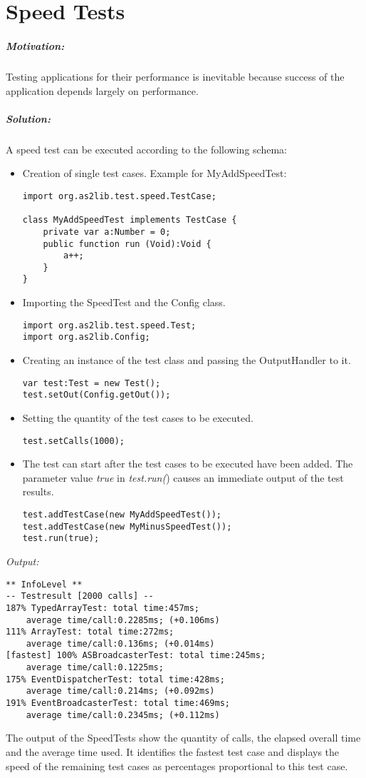 \chapter{Speed Tests}
\label{sec:SpeedTests}

\paragraph{Motivation:}
Testing applications for their performance is inevitable because success of the application depends largely on performance.

\paragraph{Solution:}
A speed test can be executed according to the following schema:
\begin{itemize}
	\item Creation of single test cases.
	Example for MyAddSpeedTest:
\begin{lstlisting}[frame=single]
import org.as2lib.test.speed.TestCase;

class MyAddSpeedTest implements TestCase {
	private var a:Number = 0;
	public function run (Void):Void {
		a++;
	}
}
\end{lstlisting}
	\item Importing the SpeedTest and the Config class.
\begin{lstlisting}[frame=single]
import org.as2lib.test.speed.Test;
import org.as2lib.Config;
\end{lstlisting}
	\item Creating an instance of the test class and passing the OutputHandler to it.
\begin{lstlisting}[frame=single]
var test:Test = new Test();
test.setOut(Config.getOut());
\end{lstlisting}
	\item Setting the quantity of the test cases to be executed.
\begin{lstlisting}[frame=single]
test.setCalls(1000);
\end{lstlisting}
	\item The test can start after the test cases to be executed have been added. The parameter value \emph{true} in \emph{test.run(}) causes an immediate output of the test results.
\begin{lstlisting}[frame=single]
test.addTestCase(new MyAddSpeedTest());
test.addTestCase(new MyMinusSpeedTest());
test.run(true);
\end{lstlisting}
\end{itemize}
\clearpage
\emph{Output:}
\begin{lstlisting}[frame=single]
** InfoLevel **
-- Testresult [2000 calls] --
187% TypedArrayTest: total time:457ms; 
	average time/call:0.2285ms; (+0.106ms)
111% ArrayTest: total time:272ms; 
	average time/call:0.136ms; (+0.014ms)
[fastest] 100% ASBroadcasterTest: total time:245ms; 
	average time/call:0.1225ms;
175% EventDispatcherTest: total time:428ms; 
	average time/call:0.214ms; (+0.092ms)
191% EventBroadcasterTest: total time:469ms; 
	average time/call:0.2345ms; (+0.112ms)
\end{lstlisting}

The output of the SpeedTests show the quantity of calls, the elapsed overall time and the average time used. It identifies the fastest test case and displays the speed of the remaining test cases as percentages proportional to this test case.
